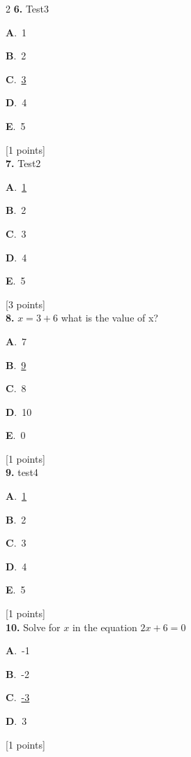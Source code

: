 \documentclass[12pt]{article}
\newcommand{\choice}[3]{%
  \noindent\textbf{#1}.~#2\hfill#3\par\vspace{0.25em}
}
\begin{document}
\begin{multicols}{2}
\noindent \textbf{\textenglish{6.}} {\textenglish{Test3}}

\noindent\choice{A}{{\textenglish{1}}}{}
\noindent\choice{B}{{\textenglish{2}}}{}
\noindent\choice{C}{\underline{{\textenglish{3}}}}{}
\noindent\choice{D}{{\textenglish{4}}}{}
\noindent\choice{E}{{\textenglish{5}}}{}
\hfill {\textenglish{[1 points]}}\\[0.5em]

\noindent \textbf{\textenglish{7.}} {\textenglish{Test2}}

\noindent\choice{A}{\underline{{\textenglish{1}}}}{}
\noindent\choice{B}{{\textenglish{2}}}{}
\noindent\choice{C}{{\textenglish{3}}}{}
\noindent\choice{D}{{\textenglish{4}}}{}
\noindent\choice{E}{{\textenglish{5}}}{}
\hfill {\textenglish{[3 points]}}\\[0.5em]

\noindent \textbf{\textenglish{8.}} \(x=3+6 \){\textenglish{ what is the value of x?}}

\noindent\choice{A}{{\textenglish{7}}}{}
\noindent\choice{B}{\underline{{\textenglish{9}}}}{}
\noindent\choice{C}{{\textenglish{8}}}{}
\noindent\choice{D}{{\textenglish{10}}}{}
\noindent\choice{E}{{\textenglish{0}}}{}
\hfill {\textenglish{[1 points]}}\\[0.5em]

\noindent \textbf{\textenglish{9.}} {\textenglish{test4}}

\noindent\choice{A}{\underline{{\textenglish{1}}}}{}
\noindent\choice{B}{{\textenglish{2}}}{}
\noindent\choice{C}{{\textenglish{3}}}{}
\noindent\choice{D}{{\textenglish{4}}}{}
\noindent\choice{E}{{\textenglish{5}}}{}
\hfill {\textenglish{[1 points]}}\\[0.5em]

\noindent \textbf{\textenglish{10.}} {\textenglish{Solve for }}\(x \){\textenglish{ in the equation }}\(2x+6 = 0 \)

\noindent\choice{A}{{\textenglish{-1}}}{}
\noindent\choice{B}{{\textenglish{-2}}}{}
\noindent\choice{C}{\underline{{\textenglish{-3}}}}{}
\noindent\choice{D}{{\textenglish{3}}}{}
\hfill {\textenglish{[1 points]}}\\[0.5em]


\end{multicols}
\end{document}
